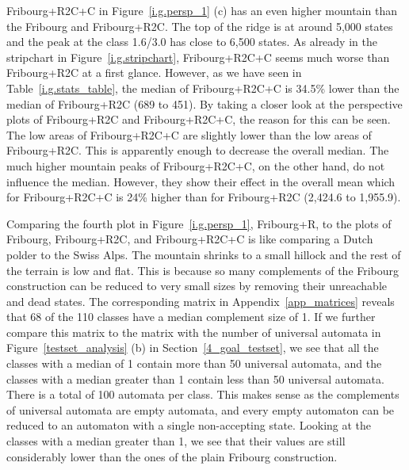 Fribourg+R2C+C in Figure~\ref{i.g.persp_1} (c) has an even higher mountain than the Fribourg and Fribourg+R2C. The top of the ridge is at around 5,000 states and the peak at the class 1.6/3.0 has close to 6,500 states. As already in the stripchart in Figure~\ref{i.g.stripchart}, Fribourg+R2C+C seems much worse than Fribourg+R2C at a first glance. However, as we have seen in Table~\ref{i.g.stats_table}, the median of Fribourg+R2C+C is 34.5\% lower than the median of Fribourg+R2C (689 to 451). By taking a closer look at the perspective plots of Fribourg+R2C and Fribourg+R2C+C, the reason for this can be seen. The low areas of Fribourg+R2C+C are slightly lower than the low areas of Fribourg+R2C. This is apparently enough to decrease the overall median. The much higher mountain peaks of Fribourg+R2C+C, on the other hand, do not influence the median. However, they show their effect in the overall mean which for Fribourg+R2C+C is 24\% higher than for Fribourg+R2C (2,424.6 to 1,955.9).

Comparing the fourth plot in Figure~\ref{i.g.persp_1}, Fribourg+R, to the plots of Fribourg, Fribourg+R2C, and Fribourg+R2C+C is like comparing a Dutch polder to the Swiss Alps. The mountain shrinks to a small hillock and the rest of the terrain is low and flat. This is because so many complements of the Fribourg construction can be reduced to very small sizes by removing their unreachable and dead states. The corresponding matrix in Appendix~\ref{app_matrices} reveals that 68 of the 110 classes have a median complement size of 1. If we further compare this matrix to the matrix with the number of universal automata in Figure~\ref{testset_analysis} (b) in Section~\ref{4_goal_testset}, we see that all the classes with a median of 1 contain more than 50 universal automata, and the classes with a median greater than 1 contain less than 50 universal automata. There is a total of 100 automata per class. This makes sense as the complements of universal automata are empty automata, and every empty automaton can be reduced to an automaton with a single non-accepting state. Looking at the classes with a median greater than 1, we see that their values are still considerably lower than the ones of the plain Fribourg construction.

